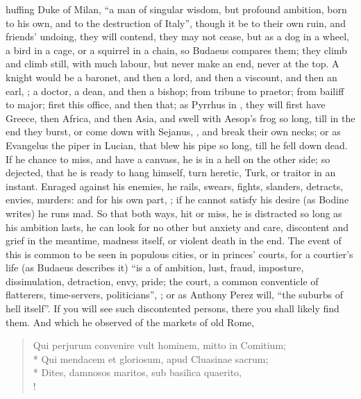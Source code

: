 huffing Duke of Milan, \enquote{a man of singular wisdom, but profound ambition, born
to his own, and to the destruction of Italy}, though it be to their own ruin,
and friends' undoing, they will contend, they may not cease, but as a dog in a
wheel, a bird in a cage, or a squirrel in a chain, so
Budaeus compares them; they climb and
climb still, with much labour, but never make an end, never at the top. A
knight would be a baronet, and then a lord, and then a viscount, and then an
earl, \etc{}; a doctor, a dean, and then a bishop; from tribune to praetor;
from bailiff to major; first this office, and then that; as Pyrrhus in
\Plutarch{}, they will first have Greece, then Africa, and
then Asia, and swell with Aesop's frog so long, till in the end they burst, or
come down with Sejanus, , and break their own necks; or
as Evangelus the piper in Lucian, that blew his pipe so long, till he fell down
dead. If he chance to miss, and have a canvass, he is in a hell on the other
side; so dejected, that he is ready to hang himself, turn heretic, Turk, or
traitor in an instant. Enraged against his enemies, he rails, swears, fights,
slanders, detracts, envies, murders: and for his own part, ; if he cannot satisfy his desire (as
Bodine writes) he runs mad. So that both ways, hit or
miss, he is distracted so long as his ambition lasts, he can look for no other
but anxiety and care, discontent and grief in the meantime,
madness itself, or violent death in the end. The event of
this is common to be seen in populous cities, or in princes' courts, for a
courtier's life (as Budaeus describes it) \enquote{is a  of ambition, lust, fraud,
imposture, dissimulation, detraction, envy, pride; the
court, a common conventicle of flatterers, time-servers, politicians}, \etc{};
or as Anthony Perez will, \enquote{the suburbs of hell itself}. If
you will see such discontented persons, there you shall likely find them.
And which he observed of the markets of old Rome,

\begin{latin}
\begin{verse}%
Qui perjurum convenire vult hominem, mitto in Comitium;\\*
Qui mendacem et gloriosum, apud Cluasinae sacrum;\\*
Dites, damnosos maritos, sub basilica quaerito, \etc{}\\!
\end{verse}%
\end{latin}

